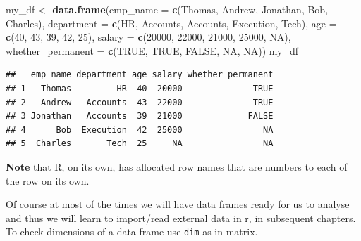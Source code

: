 \documentclass[
]{book}
\newenvironment{Shaded}{\begin{snugshade}}{\end{snugshade}}
\newcommand{\AttributeTok}[1]{\textcolor[rgb]{0.13,0.29,0.53}{#1}}
\newcommand{\ConstantTok}[1]{\textcolor[rgb]{0.56,0.35,0.01}{#1}}
\newcommand{\DecValTok}[1]{\textcolor[rgb]{0.00,0.00,0.81}{#1}}
\newcommand{\FunctionTok}[1]{\textcolor[rgb]{0.13,0.29,0.53}{\textbf{#1}}}
\newcommand{\NormalTok}[1]{#1}
\newcommand{\OtherTok}[1]{\textcolor[rgb]{0.56,0.35,0.01}{#1}}
\newcommand{\StringTok}[1]{\textcolor[rgb]{0.31,0.60,0.02}{#1}}
\begin{document}
\begin{Shaded}
\begin{Highlighting}[]
\NormalTok{my\_df }\OtherTok{\textless{}{-}} \FunctionTok{data.frame}\NormalTok{(}\AttributeTok{emp\_name =} \FunctionTok{c}\NormalTok{(}\StringTok{\textquotesingle{}Thomas\textquotesingle{}}\NormalTok{, }\StringTok{\textquotesingle{}Andrew\textquotesingle{}}\NormalTok{, }\StringTok{\textquotesingle{}Jonathan\textquotesingle{}}\NormalTok{, }\StringTok{\textquotesingle{}Bob\textquotesingle{}}\NormalTok{, }\StringTok{\textquotesingle{}Charles\textquotesingle{}}\NormalTok{),}
                    \AttributeTok{department =} \FunctionTok{c}\NormalTok{(}\StringTok{\textquotesingle{}HR\textquotesingle{}}\NormalTok{, }\StringTok{\textquotesingle{}Accounts\textquotesingle{}}\NormalTok{, }\StringTok{\textquotesingle{}Accounts\textquotesingle{}}\NormalTok{, }\StringTok{\textquotesingle{}Execution\textquotesingle{}}\NormalTok{, }\StringTok{\textquotesingle{}Tech\textquotesingle{}}\NormalTok{),}
                    \AttributeTok{age =} \FunctionTok{c}\NormalTok{(}\DecValTok{40}\NormalTok{, }\DecValTok{43}\NormalTok{, }\DecValTok{39}\NormalTok{, }\DecValTok{42}\NormalTok{, }\DecValTok{25}\NormalTok{),}
                    \AttributeTok{salary =} \FunctionTok{c}\NormalTok{(}\DecValTok{20000}\NormalTok{, }\DecValTok{22000}\NormalTok{, }\DecValTok{21000}\NormalTok{, }\DecValTok{25000}\NormalTok{, }\ConstantTok{NA}\NormalTok{),}
                    \AttributeTok{whether\_permanent =} \FunctionTok{c}\NormalTok{(}\ConstantTok{TRUE}\NormalTok{, }\ConstantTok{TRUE}\NormalTok{, }\ConstantTok{FALSE}\NormalTok{, }\ConstantTok{NA}\NormalTok{, }\ConstantTok{NA}\NormalTok{))}
\NormalTok{my\_df}
\end{Highlighting}
\end{Shaded}

\begin{verbatim}
##   emp_name department age salary whether_permanent
## 1   Thomas         HR  40  20000              TRUE
## 2   Andrew   Accounts  43  22000              TRUE
## 3 Jonathan   Accounts  39  21000             FALSE
## 4      Bob  Execution  42  25000                NA
## 5  Charles       Tech  25     NA                NA
\end{verbatim}

\textbf{Note} that R, on its own, has allocated row names that are numbers to each of the row on its own.

Of course at most of the times we will have data frames ready for us to analyse and thus we will learn to import/read external data in r, in subsequent chapters. To check dimensions of a data frame use \texttt{dim} as in matrix.
\end{document}
